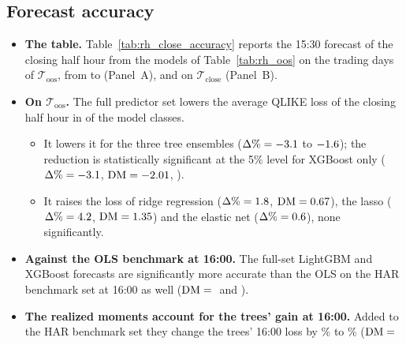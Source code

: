 \subsection{Forecast accuracy}
\label{app:rh_closing_accuracy}
\begin{itemize}
\item \textbf{The table.} Table~\ref{tab:rh_close_accuracy} reports the 15:30 forecast of the closing half hour from
  the models of Table~\ref{tab:rh_oos} on the \rhcaNdaysSpan{} trading days of $\mathcal T_{\mathrm{oos}}$,
  from \rhcaStartSpan{} to \rhcaEndSpan{} (Panel~A), and on $\mathcal T_{\mathrm{close}}$ (Panel~B).
\item \textbf{On $\mathcal T_{\mathrm{oos}}$.} The full predictor set lowers the average QLIKE loss of the closing
  half hour in \rhcaNLowerCloseSpan{} of the \rhorAfPairs{} model classes.
  \begin{itemize}
  \item It lowers it for the three tree ensembles ($\Delta\% = -3.1$ to
    $-1.6$); the reduction is statistically significant at the 5\% level for XGBoost only
    ($\Delta\% = -3.1$, $\mathrm{DM} = -2.01$, \rhcaPXgbCloseSpan).
  \item It raises the loss of ridge regression ($\Delta\% = 1.8$, $\mathrm{DM} = 0.67$),
    the lasso ($\Delta\% = 4.2$, $\mathrm{DM} = 1.35$) and the elastic net
    ($\Delta\% = 0.6$), none significantly.
  \end{itemize}
\item \textbf{Against the OLS benchmark at 16:00.} The full-set LightGBM and XGBoost forecasts are significantly
  more accurate than the OLS on the HAR benchmark set at 16:00 as well ($\mathrm{DM}={}$\rhorVsOlsDmLgbmFullClose{} and
  \rhorVsOlsDmXgbFullClose).
\item \textbf{The realized moments account for the trees' gain at 16:00.} Added to the HAR benchmark set they
  change the trees' 16:00 loss by \rhabLgbmAddRmClosePct\% to \rhabXgbAddRmClosePct\% ($\mathrm{DM}={}$\rhabLgbmAddRmCloseDm{}

\end{itemize}
